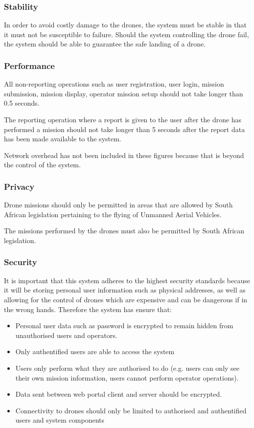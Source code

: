\documentclass{article}
\begin{document}
	\subsubsection{Stability}
	\setlength{\leftskip}{61px}
	In order to avoid costly damage to the drones, the system must be stable in that it must not be susceptible to failure. Should the system controlling the drone fail, the system should be able to guarantee the safe landing of a drone.
	
	\subsubsection{Performance}
	All non-reporting operations such as user registration, user login, mission submission, mission display, operator mission setup should not take longer than 0.5 seconds.
	
	The reporting operation where a report is given to the user after the drone has performed a mission should not take longer than 5 seconds after the report data has been made available to the system.
	
	Network overhead has not been included in these figures because that is beyond the control of the system.
	
	\subsubsection{Privacy}
	Drone missions should only be permitted in areas that are allowed by South African legislation pertaining to the flying of Unmanned Aerial Vehicles.
	
	The missions performed by the drones must also be permitted by South African legislation.
	
	\subsubsection{Security}
	It is important that this system adheres to the highest security standards because it will be storing personal user information such as physical addresses, as well as allowing for the control of drones which are expensive and can be dangerous if in the wrong hands. Therefore the system has ensure that:
	\begin{itemize}
		\item Personal user data such as password is encrypted to remain hidden from unauthorised users and operators.
		\item Only authentified users are able to access the system
		\item Users only perform what they are authorised to do (e.g. users can only see their own mission information, users cannot perform operator operations).
		\item Data sent between web portal client and server should be encrypted.
		\item Connectivity to drones should only be limited to authorised and authentified users and system components
	\end{itemize}
	
\end{document}

